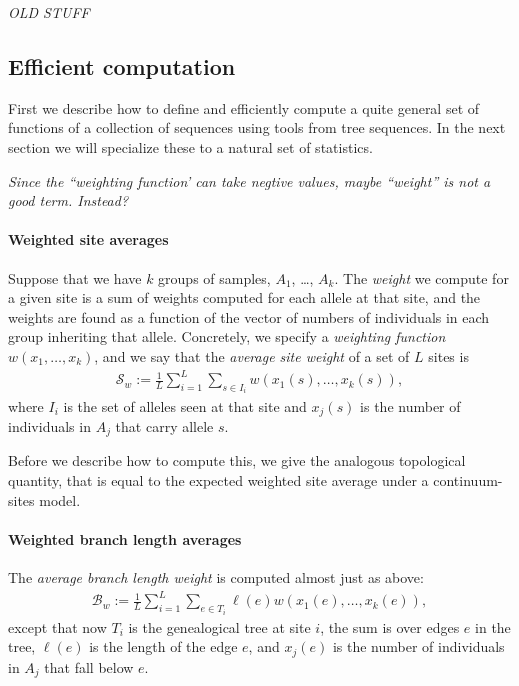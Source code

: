 \documentclass{article}
\newcommand{\branch}{\mathcal{B}} %
\newcommand{\site}{\mathcal{S}} %
\newcommand{\plr}[1]{{\color{blue} \it #1}}
\begin{document}


\newpage
\appendix

{\Large \plr{OLD STUFF}}

\subsection*{Efficient computation}

First we describe how to define
and efficiently compute a quite general set of functions of a collection of sequences
using tools from tree sequences.
In the next section we will specialize these to a natural set of statistics.

\plr{Since the ``weighting function' can take negtive values, maybe ``weight'' is not a good term.  Instead?}

\paragraph{Weighted site averages}
Suppose that we have $k$ groups of samples, $A_1$, \ldots, $A_k$.
The \emph{weight} we compute for a given site is a sum of weights computed for each allele at that site,
and the weights are found as a function of the vector of numbers of individuals in each group inheriting that allele.
Concretely, we specify a \emph{weighting function} $w(x_1, \ldots, x_k)$,
and we say that the \emph{average site weight} of a set of $L$ sites is
\begin{align} \label{eqn:average_site_weight}
    \site_w := \frac{1}{L} \sum_{i=1}^L \sum_{s \in I_i} w(x_1(s), \ldots, x_k(s)) ,
\end{align}
where $I_i$ is the set of alleles seen at that site and
$x_j(s)$ is the number of individuals in $A_j$ that carry allele $s$.

Before we describe how to compute this,
we give the analogous topological quantity,
that is equal to the expected weighted site average
under a continuum-sites model.

\paragraph{Weighted branch length averages}
The \emph{average branch length weight}
is computed almost just as above:
\begin{align} \label{eqn:average_branch_weight}
    \branch_w :=  \frac{1}{L} \sum_{i=1}^L \sum_{e \in T_i} \ell(e) w(x_1(e), \ldots, x_k(e)) ,
\end{align}
except that now $T_i$ is the genealogical tree at site $i$,
the sum is over edges $e$ in the tree, $\ell(e)$ is the length of the edge $e$,
and $x_j(e)$ is the number of individuals in $A_j$ that fall below $e$.
\end{document}
